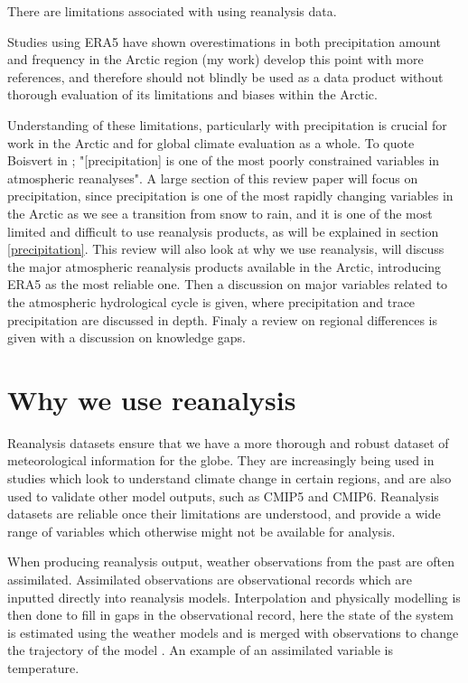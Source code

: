 \documentclass[11pt, oneside]{article}
\begin{document}
There are limitations associated with using reanalysis data. 


Studies using ERA5 have shown overestimations in both precipitation amount and frequency in the Arctic region (my work) 
 develop this point with more references, 
 and therefore should not blindly be used as a data product without thorough evaluation of its limitations and biases within the Arctic. 

Understanding of these limitations, particularly with precipitation is crucial for work in the Arctic and for global climate evaluation as a whole. To quote Boisvert in \cite{boisvert2018intercomparison}; "[precipitation] is one of the most poorly constrained variables in atmospheric reanalyses". A large section of this review paper will focus on precipitation, since precipitation is one of the most rapidly changing variables in the Arctic as we see a transition from snow to rain, and it is one of the most limited and difficult to use reanalysis products, as will be explained in section \ref{precipitation}. This review will also look at why we use reanalysis, will discuss the major atmospheric reanalysis products available in the Arctic, introducing ERA5 as the most reliable one. Then a discussion on major variables related to the atmospheric hydrological cycle is given, where precipitation and trace precipitation are discussed in depth. Finaly a review on regional differences is given with a discussion on knowledge gaps. 


\section{Why we use reanalysis}
Reanalysis datasets ensure that we have a more thorough and robust dataset of meteorological information for the globe. They are increasingly being used in studies which look to understand climate change in certain regions, and are also used to validate other model outputs, such as CMIP5 and CMIP6. Reanalysis datasets are reliable once their limitations are understood, and provide a wide range of variables which otherwise might not be available for analysis. 

When producing reanalysis output, weather observations from the past are often assimilated. Assimilated observations are observational records which are inputted directly into reanalysis models. Interpolation and physically modelling is then done to fill in gaps in the observational record, here the state of the system is estimated using the weather models and is merged with observations to change the trajectory of the model \cite{fletcher2022data}. An example of an assimilated variable is temperature. 
\end{document}
